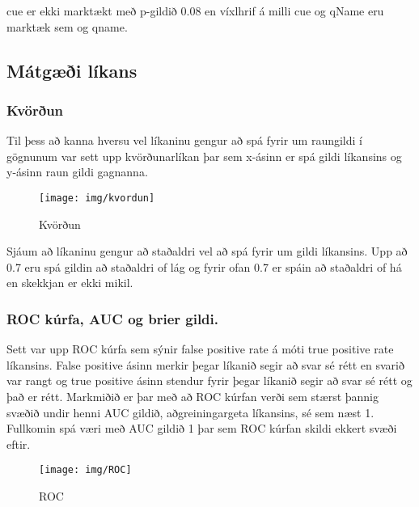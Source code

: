 \documentclass[
  10pt,
]{article}
\begin{document}
cue er ekki marktækt með p-gildið 0.08 en víxlhrif á milli cue og qName eru marktæk sem og qname.

\newpage

\hypertarget{muxe1tguxe6uxf0i-luxedkans}{%
\subsection{Mátgæði líkans}\label{muxe1tguxe6uxf0i-luxedkans}}

\hypertarget{kvuxf6ruxf0un}{%
\subsubsection{Kvörðun}\label{kvuxf6ruxf0un}}

Til þess að kanna hversu vel líkaninu gengur að spá fyrir um raungildi í gögnunum var sett upp kvörðunarlíkan þar sem x-ásinn er spá gildi líkansins og y-ásinn raun gildi gagnanna.

\begin{figure}[H]

{\centering \texttt{[image: img/kvordun]} 

}

\caption{Kvörðun}\label{fig:unnamed-chunk-10}
\end{figure}

Sjáum að líkaninu gengur að staðaldri vel að spá fyrir um gildi líkansins. Upp að 0.7 eru spá gildin að staðaldri of lág og fyrir ofan 0.7 er spáin að staðaldri of há en skekkjan er ekki mikil.

\newpage

\hypertarget{roc-kuxfarfa-auc-og-brier-gildi.}{%
\subsubsection{ROC kúrfa, AUC og brier gildi.}\label{roc-kuxfarfa-auc-og-brier-gildi.}}

Sett var upp ROC kúrfa sem sýnir false positive rate á móti true positive rate líkansins. False positive ásinn merkir þegar líkanið segir að svar sé rétt en svarið var rangt og true positive ásinn stendur fyrir þegar líkanið segir að svar sé rétt og það er rétt.
Markmiðið er þar með að ROC kúrfan verði sem stærst þannig svæðið undir henni AUC gildið, aðgreiningargeta líkansins, sé sem næst 1. Fullkomin spá væri með AUC gildið 1 þar sem ROC kúrfan skildi ekkert svæði eftir.

\begin{figure}[H]

{\centering \texttt{[image: img/ROC]} 

}

\caption{ROC}\label{fig:mynd7}
\end{figure}
\end{document}
